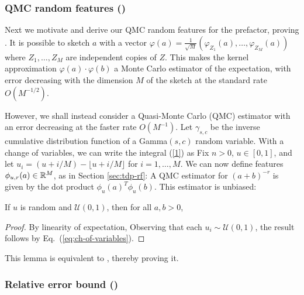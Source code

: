 \subsubsection{QMC random features ()}
Next we motivate and derive our QMC random features for the prefactor,
proving .
It is possible to sketch $a$ with a vector $\varphi(a) = \frac{1}{\sqrt{M}}(\varphi_{Z_1}(a),\dots,\varphi_{Z_M}(a))$ where $Z_1,\dots,Z_M$ are independent copies of $Z$. This makes the kernel approximation $\varphi(a)\cdot \varphi(b)$ a Monte Carlo estimator of the expectation, with error decreasing with the dimension $M$ of the sketch at the standard rate $O(M^{-1/2})$. 

However, we shall instead consider a Quasi-Monte Carlo (QMC) estimator with an error decreasing at the faster rate $O(M^{-1})$.
Let $\gamma_{s,c}$ be the inverse cumulative distribution function of a Gamma$(s,c)$ random variable. With a change of variables, we can write the integral (\ref{1}) as 
Fix $n>0$, $u\in[0,1]$, and let $u_i = (u + i/M)- \lfloor u + i/M \rfloor $ for $i=1,\dots,M$. We can now define features $\phi_{u,r}(a)\in \mathbb{R}^M$, as in Section \ref{sec:tdp-rf}:
A QMC estimator for $(a+b)^{-r}$ is given by the dot product $\phi_u(a)^T \phi_u(b)$.
This estimator is unbiased:
\begin{lemma*}
If $u$ is random and $\mathcal U(0,1)$, then for all $a,b>0$,
\end{lemma*}
\begin{proof}
By linearity of expectation,
Observing that each $u_i\sim\mathcal U(0,1)$, the result follows by Eq.\ (\ref{eq:ch-of-variables}).
\end{proof}
This lemma is equivalent to , thereby proving it.

\subsubsection{Relative error bound ()}

